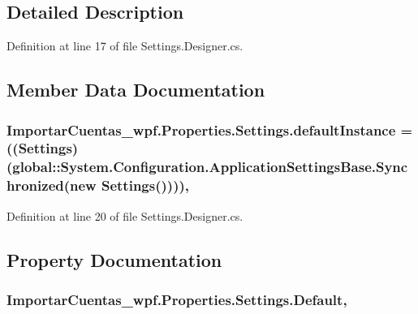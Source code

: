 \subsection{Detailed Description}


Definition at line 17 of file Settings.\-Designer.\-cs.



\subsection{Member Data Documentation}
\hypertarget{class_importar_cuentas__wpf_1_1_properties_1_1_settings_acf093934d400c122671c08677ca0943c}{
\subsubsection[{default\-Instance}]{ Importar\-Cuentas\-\_\-wpf.\-Properties.\-Settings.\-default\-Instance = (({\bf Settings})(global\-::\-System.\-Configuration.\-Application\-Settings\-Base.\-Synchronized(new {\bf Settings}())))\hspace{0.3cm}{\ttfamily [static]}, {\ttfamily [private]}}}\label{class_importar_cuentas__wpf_1_1_properties_1_1_settings_acf093934d400c122671c08677ca0943c}


Definition at line 20 of file Settings.\-Designer.\-cs.



\subsection{Property Documentation}
\hypertarget{class_importar_cuentas__wpf_1_1_properties_1_1_settings_aa8fd5eae41c6562c29fbf61aca776b32}{
\subsubsection[{Default}]{ Importar\-Cuentas\-\_\-wpf.\-Properties.\-Settings.\-Default\hspace{0.3cm}{\ttfamily [static]}, {\ttfamily [get]}}}\label{class_importar_cuentas__wpf_1_1_properties_1_1_settings_aa8fd5eae41c6562c29fbf61aca776b32}


